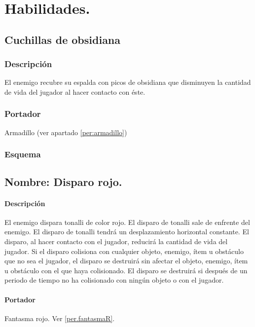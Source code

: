 \chapter{Habilidades.}
	\section{Cuchillas de obsidiana} \label{hab.CuchObs}	
		\subsection{Descripción}
		El enemigo recubre su espalda con picos de obsidiana que disminuyen la cantidad de vida del jugador al hacer contacto con éste.
		\subsection{Portador}
		Armadillo (ver apartado \ref{per:armadillo})
		\subsection{Esquema}

		\section{Nombre: Disparo rojo.} \label{hab.disparoR}
		\subsubsection{Descripción}
El enemigo dispara tonalli de color rojo. El disparo de tonalli sale de enfrente del enemigo. El disparo de tonalli tendrá un desplazamiento horizontal constante. El disparo, al hacer contacto con el jugador, reducirá la cantidad de vida del jugador. Si el disparo colisiona con cualquier objeto, enemigo, ítem u obstáculo que no sea el jugador, el disparo se destruirá sin afectar el objeto, enemigo, ítem u obstáculo con el que haya colisionado. El disparo se destruirá si después de un periodo de tiempo no ha colisionado con ningún objeto o con el jugador.
		\subsubsection{Portador}
		Fantasma rojo. Ver \ref{per.fantasmaR}.
